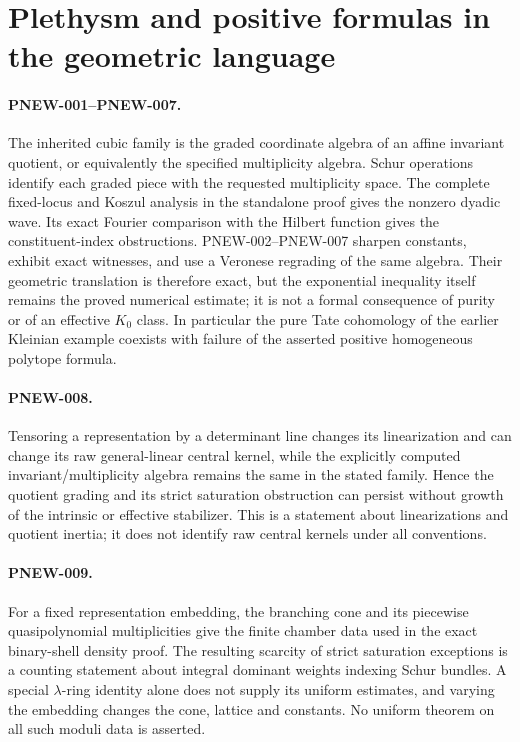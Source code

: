 \section{Plethysm and positive formulas in the geometric language}

\paragraph{PNEW-001--PNEW-007.}
The inherited cubic family is the graded coordinate algebra
of an affine invariant quotient, or equivalently the specified
multiplicity algebra.  Schur operations identify each graded
piece with the requested multiplicity space.  The complete
fixed-locus and Koszul analysis in the standalone proof gives
the nonzero dyadic wave.  Its exact Fourier comparison with
the Hilbert function gives the constituent-index obstructions.
PNEW-002--PNEW-007 sharpen constants, exhibit exact witnesses,
and use a Veronese regrading of the same algebra.  Their
geometric translation is therefore exact, but the exponential
inequality itself remains the proved numerical estimate; it
is not a formal consequence of purity or of an effective
$K_0$ class.  In particular the pure Tate cohomology of the
earlier Kleinian example coexists with failure of the asserted
positive homogeneous polytope formula.

\paragraph{PNEW-008.}
Tensoring a representation by a determinant line changes its
linearization and can change its raw general-linear central kernel, while
the explicitly computed invariant/multiplicity algebra remains
the same in the stated family.  Hence the quotient grading
and its strict saturation obstruction can persist without
growth of the intrinsic or effective stabilizer.  This is a
statement about linearizations and quotient inertia; it does
not identify raw central kernels under all conventions.

\paragraph{PNEW-009.}
For a fixed representation embedding, the branching cone and
its piecewise quasipolynomial multiplicities give the finite
chamber data used in the exact binary-shell density proof.
The resulting scarcity of strict saturation exceptions is a
counting statement about integral dominant weights indexing
Schur bundles.  A special $\lambda$-ring identity alone does
not supply its uniform estimates, and varying the embedding
changes the cone, lattice and constants.  No uniform theorem
on all such moduli data is asserted.

